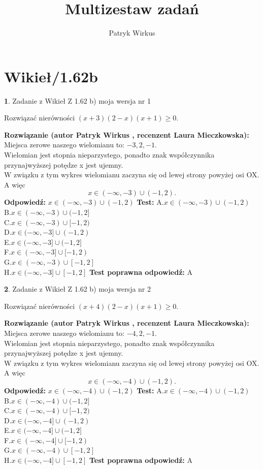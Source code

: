 \documentclass[12pt, a4paper]{article}
\title{Multizestaw zadań}
\author{Patryk Wirkus}
\date{}
\theoremstyle{definition} %
\newtheorem{zad}{}
\newcommand{\kategoria}[1]{\section{#1}}
\newcommand{\zadStart}[1]{\begin{zad}#1\newline}
\newcommand{\zadStop}{\end{zad}}
\newcommand{\rozwStart}[2]{\noindent \textbf{Rozwiązanie (autor #1 , recenzent #2): }\newline}
\newcommand{\rozwStop}{\newline}
\newcommand{\odpStart}{\noindent \textbf{Odpowiedź:}\newline}
\newcommand{\odpStop}{\newline}
\newcommand{\testStart}{\noindent \textbf{Test:}\newline}
\newcommand{\testStop}{\newline}
\newcommand{\kluczStart}{\noindent \textbf{Test poprawna odpowiedź:}\newline}
\newcommand{\kluczStop}{\newline}
\begin{document}
\maketitle

\kategoria{Wikieł/1.62b}


\zadStart{Zadanie z Wikieł Z 1.62 b) moja wersja nr 1}

Rozwiązać nierówności $(x+3)(2-x)(x+1)\ge0$.
\zadStop
\rozwStart{Patryk Wirkus}{Laura Mieczkowska}
Miejsca zerowe naszego wielomianu to: $-3, 2, -1$.\\
Wielomian jest stopnia nieparzystego, ponadto znak współczynnika przy\linebreak najwyższej potędze x jest ujemny.\\ W związku z tym wykres wielomianu zaczyna się od lewej strony powyżej osi OX. A więc $$x \in (-\infty,-3) \cup (-1,2).$$
\rozwStop
\odpStart
$x \in (-\infty,-3) \cup (-1,2)$
\odpStop
\testStart
A.$x \in (-\infty,-3) \cup (-1,2)$\\
B.$x \in (-\infty,-3) \cup (-1,2]$\\
C.$x \in (-\infty,-3) \cup [-1,2)$\\
D.$x \in (-\infty,-3] \cup (-1,2)$\\
E.$x \in (-\infty,-3] \cup (-1,2]$\\
F.$x \in (-\infty,-3] \cup [-1,2)$\\
G.$x \in (-\infty,-3) \cup [-1,2]$\\
H.$x \in (-\infty,-3] \cup [-1,2]$
\testStop
\kluczStart
A
\kluczStop



\zadStart{Zadanie z Wikieł Z 1.62 b) moja wersja nr 2}

Rozwiązać nierówności $(x+4)(2-x)(x+1)\ge0$.
\zadStop
\rozwStart{Patryk Wirkus}{Laura Mieczkowska}
Miejsca zerowe naszego wielomianu to: $-4, 2, -1$.\\
Wielomian jest stopnia nieparzystego, ponadto znak współczynnika przy\linebreak najwyższej potędze x jest ujemny.\\ W związku z tym wykres wielomianu zaczyna się od lewej strony powyżej osi OX. A więc $$x \in (-\infty,-4) \cup (-1,2).$$
\rozwStop
\odpStart
$x \in (-\infty,-4) \cup (-1,2)$
\odpStop
\testStart
A.$x \in (-\infty,-4) \cup (-1,2)$\\
B.$x \in (-\infty,-4) \cup (-1,2]$\\
C.$x \in (-\infty,-4) \cup [-1,2)$\\
D.$x \in (-\infty,-4] \cup (-1,2)$\\
E.$x \in (-\infty,-4] \cup (-1,2]$\\
F.$x \in (-\infty,-4] \cup [-1,2)$\\
G.$x \in (-\infty,-4) \cup [-1,2]$\\
H.$x \in (-\infty,-4] \cup [-1,2]$
\testStop
\kluczStart
A
\kluczStop
\end{document}
